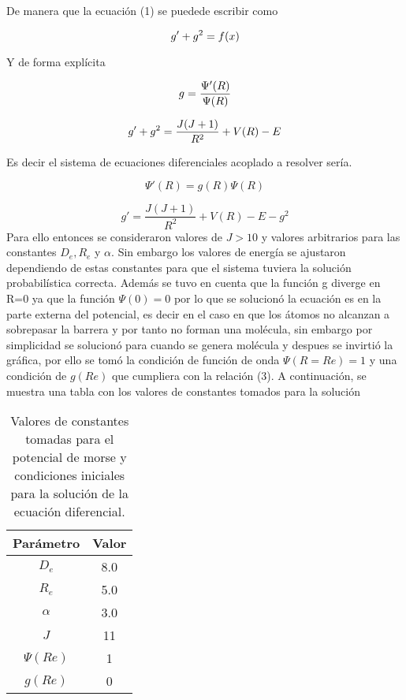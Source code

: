 \documentclass[twocolumn,preprintnumbers,amsmath,amssymb,aps,prl]{revtex4}
\begin{document}
De manera que la ecuación (1) se puedede escribir como

\begin{equation}\notag
    g'+g^2=f(x)
\end{equation}

Y de forma explícita

\begin{equation}\notag
    g=\frac{\Psi'(R)}{\Psi(R)}
\end{equation}

\begin{equation}\notag
    g'+g^2=\frac{J(J+1)}{R^2}+V(R)-E
\end{equation}

Es decir el sistema de ecuaciones diferenciales acoplado a resolver sería.

\begin{equation}\label{E2}
    \Psi'(R)=g(R)\Psi(R)
\end{equation}

\begin{equation}
    g'=\frac{J(J+1)}{R^2}+V(R)-E-g^2
\end{equation}
Para ello entonces se consideraron valores de $J>10$ y valores arbitrarios para las constantes $D_e, R_e$ y $\alpha$. Sin embargo los valores de energía se ajustaron dependiendo de estas constantes para que el sistema tuviera la solución probabilística correcta. Además se tuvo en cuenta que la función g diverge en R=0 ya que la función $\Psi(0)=0$ por lo que se solucionó la ecuación es en la parte externa del potencial, es decir en el caso en que los átomos no alcanzan a sobrepasar la barrera y por tanto no forman una molécula, sin embargo por simplicidad se solucionó para cuando se genera molécula y despues se invirtió la gráfica, por ello se tomó la condición de función de onda $\Psi(R=Re)=1$ y una condición de $g(Re)$ que cumpliera con la relación (3).
A continuación, se muestra una tabla con los valores de constantes tomados para la solución

\begin{table}[h!]
    \centering
    \begin{tabular}{|c|c|}\hline
    Parámetro & Valor \\\hline
    $D_e$ & 8.0 \\\hline
    $R_e$ & 5.0 \\\hline
    $\alpha$& 3.0 \\\hline
    $J$ & 11 \\\hline
    $\Psi(Re)$ & 1 \\\hline
    $g(Re)$ & 0 \\\hline
    \end{tabular}
    \caption{Valores de constantes tomadas para el potencial de morse y condiciones iniciales para la solución de la ecuación diferencial.}
    \label{tabla1}
\end{table}
\end{document}
